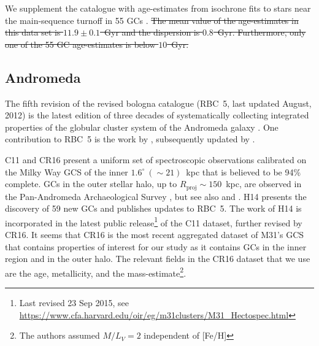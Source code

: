 \documentclass[a4paper,fleqn,usenatbib]{mnras}
\providecommand{\DIFdel}[1]{{\protect\color{red}\sout{#1}}}                      %
\providecommand{\DIFaddbegin}{} %
\providecommand{\DIFaddend}{} %
\providecommand{\DIFdelbegin}{} %
\providecommand{\DIFdelend}{} %
\newcommand{\DIFscaledelfig}{0.5}
\newlength{\DIFdelgraphicswidth} %
\newlength{\DIFdelgraphicsheight} %
\newcommand{\DIFaddincludegraphics}[2][]{{\color{blue}\fbox{\DIFOincludegraphics[#1]{#2}}}} %
\newcommand{\DIFdelincludegraphics}[2][]{%
\sbox{\DIFdelgraphicsbox}{\DIFOincludegraphics[#1]{#2}}%
\settoboxwidth{\DIFdelgraphicswidth}{\DIFdelgraphicsbox} %
\settoboxtotalheight{\DIFdelgraphicsheight}{\DIFdelgraphicsbox} %
\scalebox{\DIFscaledelfig}{%
\parbox[b]{\DIFdelgraphicswidth}{\usebox{\DIFdelgraphicsbox}\\[-\baselineskip] \rule{\DIFdelgraphicswidth}{0em}}\llap{\resizebox{\DIFdelgraphicswidth}{\DIFdelgraphicsheight}{%
\setlength{\unitlength}{\DIFdelgraphicswidth}%
\begin{picture}(1,1)%
\thicklines\linethickness{2pt} %
{\color[rgb]{1,0,0}\put(0,0){\framebox(1,1){}}}%
{\color[rgb]{1,0,0}\put(0,0){\line( 1,1){1}}}%
{\color[rgb]{1,0,0}\put(0,1){\line(1,-1){1}}}%
\end{picture}%
}\hspace*{3pt}}} %
} %
\DeclareRobustCommand{\DIFaddbegin}{\DIFOaddbegin \let\includegraphics\DIFaddincludegraphics} %
\DeclareRobustCommand{\DIFaddend}{\DIFOaddend \let\includegraphics\DIFOincludegraphics} %
\DeclareRobustCommand{\DIFdelbegin}{\DIFOdelbegin \let\includegraphics\DIFdelincludegraphics} %
\DeclareRobustCommand{\DIFdelend}{\DIFOaddend \let\includegraphics\DIFOincludegraphics} %
\begin{document}

\DIFdelend We supplement the catalogue
with age-estimates from isochrone fits to stars near the main-sequence turnoff 
in 55 GCs \citep[][hereafter V13]{2013ApJ...775..134V}.
\DIFdelbegin \DIFdel{The mean value of the age-estimates in this data set is $11.9 \pm 0.1$~Gyr and
the dispersion is $0.8$~Gyr. Furthermore, only one of the 55 GC age-estimates is
below $10$~Gyr.
}\DIFdelend \DIFaddbegin 

\DIFaddend 

\subsection{Andromeda}
\label{sec:andromeda}
The fifth revision of the revised bologna catalogue (RBC~5, last updated
August, 2012) is the latest edition of three decades of systematically
collecting integrated properties of the globular cluster system of the
Andromeda galaxy \citep[][and references therein]{2004A&A...416..917G}. One
contribution to RBC~5 is the work by \citet[][hereafter C11]{2011AJ....141...61C},
subsequently updated by \citet[][hereafter CR16]{2016ApJ...824...42C}.

C11 and CR16 present a uniform set of spectroscopic observations calibrated
on the Milky Way GCS of the inner $1.6^\circ~({\sim}21)$~kpc that
is believed to be 94\% complete. GCs in the outer stellar halo, up to
$R_{\text{proj}}\sim150$~kpc, are observed in the Pan-Andromeda Archaeological
Survey \citep[PAndAS, ][hereafter H14]{2014MNRAS.442.2165H}, but see also
\citet{2014MNRAS.442.2929V} and \citet{2019MNRAS.484.1756M}. H14 presents the
discovery of 59 new GCs and publishes updates to RBC~5. The work of H14 is
incorporated in the latest public release\footnote{Last revised 23 Sep 2015, see
\url{https://www.cfa.harvard.edu/oir/eg/m31clusters/M31_Hectospec.html}}
of the C11 dataset, further revised by CR16. It seems that CR16 is the most
recent aggregated dataset of M31's GCS that contains properties of interest
for our study as it contains GCs in the inner region and in the outer halo. The
relevant fields in the CR16 dataset that we use are the age, metallicity, and the
mass-estimate\footnote{The authors assumed $M/L_V = 2$ independent of [Fe/H]}.
\end{document}
